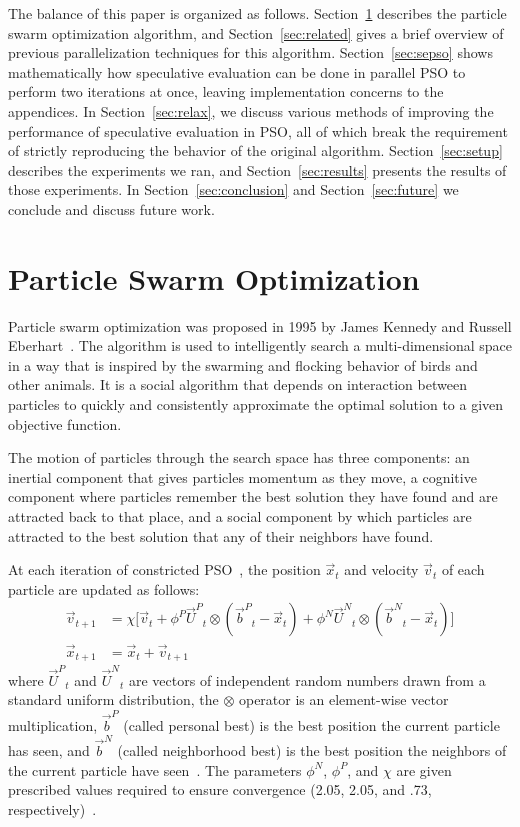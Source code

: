 \documentclass[smallcondensed]{svjour3}
\renewcommand{\sec}[1]{Section~\ref{sec:#1}}
\providecommand{\pers}{\ensuremath{P}}
\providecommand{\neigh}{\ensuremath{N}}
\providecommand{\nURand}{\ensuremath{\Vec{U}^\neigh}}
\providecommand{\pURand}{\ensuremath{\Vec{U}^\pers}}
\providecommand{\ppos}{\ensuremath{\Vec{x}}}
\providecommand{\pvel}{\ensuremath{\Vec{v}}}
\providecommand{\nbest}{\ensuremath{\Vec{b}^\neigh}}
\providecommand{\pbest}{\ensuremath{\Vec{b}^\pers}}
\providecommand{\constriction}{\ensuremath{\chi}}
\providecommand{\ncoeff}{\ensuremath{\phi^\neigh}}
\providecommand{\pcoeff}{\ensuremath{\phi^\pers}}
\begin{document}
The balance of this paper is organized as follows. \sec{pso} describes the
particle swarm optimization algorithm, and \sec{related} gives a brief overview
of previous parallelization techniques for this algorithm.  \sec{sepso} shows
mathematically how speculative evaluation can be done in parallel PSO to
perform two iterations at once, leaving implementation concerns to the
appendices.  In \sec{relax}, we discuss various methods of improving the
performance of speculative evaluation in PSO, all of which break the
requirement of strictly reproducing the behavior of the original algorithm.
\sec{setup} describes the experiments we ran, and \sec{results} presents the
results of those experiments.  In \sec{conclusion} and \sec{future} we conclude
and discuss future work.

\section{Particle Swarm Optimization}
\label{sec:pso}

Particle swarm optimization was proposed in 1995 by James Kennedy and Russell
Eberhart~\citep{kennedy-1995-particle-swarm-optimization}.  The algorithm is
used to intelligently search a multi-dimensional space in a way that is
inspired by the swarming and flocking behavior of birds and other animals. It
is a social algorithm that depends on interaction between particles to quickly
and consistently approximate the optimal solution to a given objective
function.

The motion of particles through the search space has three components: an
inertial component that gives particles momentum as they move, a cognitive
component where particles remember the best solution they have found and are
attracted back to that place, and a social component by which particles are
attracted to the best solution that any of their neighbors have found.

At each iteration of constricted PSO~\citep{clerc-2002-constricted-pso}, the
position $\ppos_t$ and velocity $\pvel_t$ of each particle are updated as
follows:
\begin{align}
\label{eq:velupdate}
	\pvel_{t+1} &=
		\constriction \bigl[ \pvel_t
			+ \pcoeff\pURand_{t}\otimes(\pbest_{t} - \ppos_{t}) +
			\ncoeff\nURand_{t}\otimes(\nbest_{t} - \ppos_{t})
		\bigr] \\
\label{eq:posupdate}
	\ppos_{t+1} &= \ppos_{t} + \pvel_{t+1}
\end{align}
where \( \pURand_{t} \) and \( \nURand_{t} \) are vectors of independent random
numbers drawn from a standard uniform distribution, the \( \otimes \) operator
is an element-wise vector multiplication, $\pbest$ (called personal best) is
the best position the current particle has seen, and $\nbest$ (called
neighborhood best) is the best position the neighbors of the current particle
have seen~\citep{bratton-2007-defining-a-standard-for-pso}.  The parameters \(
\ncoeff \), \( \pcoeff \), and \( \constriction \) are given prescribed values
required to ensure convergence (2.05, 2.05, and .73,
respectively)~\citep{clerc-2002-constricted-pso}.
\end{document}
